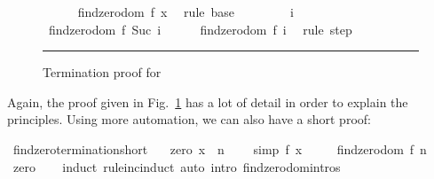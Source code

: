 \begin{isabellebody}
\begin{figure}
\begin{minipage}{0.8\textwidth}
\ \ \ \ \isamarkupfalse%
\ {\isachardoublequoteopen}findzero{\isacharunderscore}dom\ {\isacharparenleft}f{\isacharcomma}\ x{\isacharparenright}{\isachardoublequoteclose}\ \isamarkupfalse%
\ {\isacharparenleft}rule\ base{\isacharparenright}\isanewline
\ \ \isamarkupfalse%
\isanewline
\ \ \ \ \isamarkupfalse%
\ i\ \isamarkupfalse%
\ {\isachardoublequoteopen}findzero{\isacharunderscore}dom\ {\isacharparenleft}f{\isacharcomma}\ Suc\ i{\isacharparenright}{\isachardoublequoteclose}\isanewline
\ \ \ \ \isamarkupfalse%
\ {\isachardoublequoteopen}findzero{\isacharunderscore}dom\ {\isacharparenleft}f{\isacharcomma}\ i{\isacharparenright}{\isachardoublequoteclose}\ \isamarkupfalse%
\ {\isacharparenleft}rule\ step{\isacharparenright}\isanewline
\ \ \isamarkupfalse%
\isanewline
{}\isamarkupfalse%
%
\endisatagproof
{\isafoldproof}%
%
\isadelimproof
%
\endisadelimproof
%
\isamarkupfalse{}
\end{minipage}\vspace{6pt}\hrule
\caption{Termination proof for }\label{findzero_term}
\end{figure}
%
\begin{isamarkuptext}%
Again, the proof given in Fig.~\ref{findzero_term} has a lot of
  detail in order to explain the principles. Using more automation, we
  can also have a short proof:%
\end{isamarkuptext}%
\isamarkuptrue%
\isamarkupfalse%
\ findzero{\isacharunderscore}termination{\isacharunderscore}short{\isacharcolon}\isanewline
\ \ \ zero{\isacharcolon}\ {\isachardoublequoteopen}x\ {\isachargreater}{\isacharequal}\ n{\isachardoublequoteclose}\ \isanewline
\ \ \ {\isacharbrackleft}simp{\isacharbrackright}{\isacharcolon}\ {\isachardoublequoteopen}f\ x\ {\isacharequal}\ {}{\isachardoublequoteclose}\isanewline
\ \ \ {\isachardoublequoteopen}findzero{\isacharunderscore}dom\ {\isacharparenleft}f{\isacharcomma}\ n{\isacharparenright}{\isachardoublequoteclose}\isanewline
%
\isadelimproof
\ \ %
\endisadelimproof
%
\isatagproof
{}\isamarkupfalse%
\ zero\isanewline
\ \ \isamarkupfalse%
\ {\isacharparenleft}induct\ rule{\isacharcolon}inc{\isacharunderscore}induct{\isacharparenright}\ {\isacharparenleft}auto\ intro{\isacharcolon}\ findzero{\isachardot}domintros{\isacharparenright}%
\endisatagproof
{\isafoldproof}%

\end{isabellebody}
